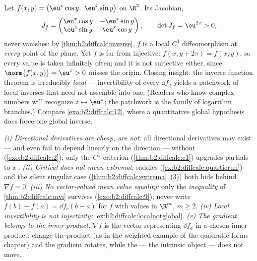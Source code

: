 \begin{example}\label{ex:b2:diffcalc:localnotglobal}
Let $f(x, y) = \bigl(\eu^x\cos y,\ \eu^x\sin y\bigr)$ on
$\R^2$. Its Jacobian,
\[
J_f = \begin{pmatrix}
\eu^x\cos y & -\eu^x\sin y\\
\eu^x\sin y & \eu^x\cos y
\end{pmatrix},
\qquad
\det J_f = \eu^{2x} > 0 ,
\]
never vanishes: by \cref{thm:b2:diffcalc:inverse}, $f$ is a
local $C^1$ diffeomorphism at \emph{every} point of the plane.
Yet $f$ is far from injective: $f(x, y + 2\pi) = f(x, y)$, so
every value is taken infinitely often; and it is not surjective
either, since $\norm{f(x, y)} = \eu^x > 0$ misses the origin.
Closing insight: the inverse function theorem is irreducibly
\emph{local} --- invertibility of every $\dd f_a$ yields a
patchwork of local inverses that need not assemble into one.
(Readers who know complex numbers will recognize $z \mapsto
\eu^z$; the patchwork is the family of logarithm branches.)
Compare \cref{exo:b2:diffcalc:12}, where a quantitative global
hypothesis does force one global inverse.
\end{example}

\begin{remark}
\emph{(i) Directional derivatives are cheap,  are
not:} all directional derivatives may exist --- and even fail
to depend linearly on the direction --- without
 (\cref{exo:b2:diffcalc:2}); only the $C^1$
criterion
(\cref{thm:b2:diffcalc:c1}) upgrades partials to a
. \emph{(ii) Critical does not mean extremal:}
saddles (\cref{ex:b2:diffcalc:quarticrun}) and the silent
singular case (\cref{thm:b2:diffcalc:extrema}~(3)) both hide
behind $\nabla f = 0$. \emph{(iii) No vector-valued mean value
equality:} only the \emph{inequality} of
\cref{thm:b2:diffcalc:mvi} survives
(\cref{exo:b2:diffcalc:9}); never write $f(b) - f(a) = \dd
f_c(b-a)$ for $f$ with values in $\R^m$, $m \geq 2$.
\emph{(iv) Local invertibility is not injectivity:}
\cref{ex:b2:diffcalc:localnotglobal}. \emph{(v) The gradient
belongs to the inner product:} $\nabla f$ is the vector
representing $\dd f_a$ in a chosen inner product; change the
product (as in the weighted example of the quadratic-forms
chapter) and the gradient rotates, while the  ---
the intrinsic object --- does not move.
\end{remark}

